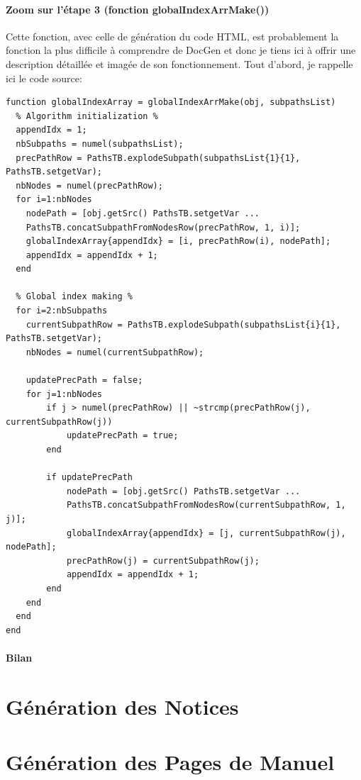 \documentclass[./standalone.tex]{subfiles}
\begin{document}
\bigskip
\subsubsection{Zoom sur l'étape 3 (fonction globalIndexArrMake())}
\vspace{0.5cm}

Cette fonction, avec celle de génération du code HTML, est probablement la fonction la plus difficile à comprendre de DocGen et donc je tiens ici à offrir une description détaillée et imagée de son fonctionnement. Tout d'abord, je rappelle ici le code source: \\

\begin{lstlisting}[style=Matlab-editor, caption={Code source de la fonction de transformation de liste de chemins absolus en tableaux de noeuds},captionpos=b]
function globalIndexArray = globalIndexArrMake(obj, subpathsList)
  % Algorithm initialization %
  appendIdx = 1;
  nbSubpaths = numel(subpathsList);
  precPathRow = PathsTB.explodeSubpath(subpathsList{1}{1}, PathsTB.setgetVar);
  nbNodes = numel(precPathRow);
  for i=1:nbNodes
	nodePath = [obj.getSrc() PathsTB.setgetVar ...
	PathsTB.concatSubpathFromNodesRow(precPathRow, 1, i)];
	globalIndexArray{appendIdx} = [i, precPathRow(i), nodePath];
	appendIdx = appendIdx + 1;
  end
	
  % Global index making %
  for i=2:nbSubpaths
	currentSubpathRow = PathsTB.explodeSubpath(subpathsList{i}{1}, PathsTB.setgetVar);
	nbNodes = numel(currentSubpathRow);
	
	updatePrecPath = false;
	for j=1:nbNodes
		if j > numel(precPathRow) || ~strcmp(precPathRow(j), currentSubpathRow(j))
			updatePrecPath = true;
		end
	
		if updatePrecPath
			nodePath = [obj.getSrc() PathsTB.setgetVar ...
			PathsTB.concatSubpathFromNodesRow(currentSubpathRow, 1, j)];
			globalIndexArray{appendIdx} = [j, currentSubpathRow(j), nodePath];
			precPathRow(j) = currentSubpathRow(j);
			appendIdx = appendIdx + 1;
		end
	end
  end
end
\end{lstlisting}

\newpage
\subsubsection{Bilan}
\vspace{0.5cm}





\chapter{Génération des Notices}


\chapter{Génération des Pages de Manuel}
\end{document}
